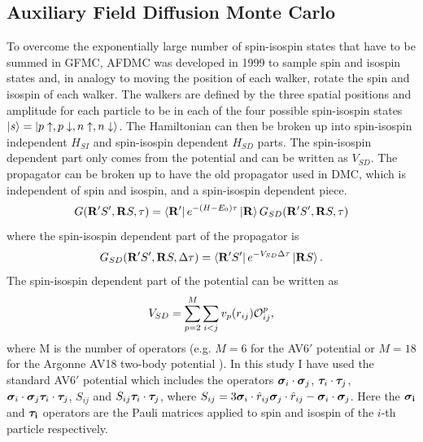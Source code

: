 \subsection{Auxiliary Field Diffusion Monte Carlo}
\label{sec:AFDMC}
To overcome the exponentially large number of spin-isospin states that have to be summed in GFMC, AFDMC was developed in 1999 \cite{schmidt1999} to sample spin and isospin states and, in analogy to moving the position of each walker, rotate the spin and isospin of each walker. The walkers are defined by the three spatial positions and amplitude for each particle to be in each of the four possible spin-isospin states $\left| s \right> = \left| p\uparrow,p\downarrow,n\uparrow,n\downarrow \right>$. The Hamiltonian can then be broken up into spin-isospin independent $H_{SI}$ and spin-isospin dependent $H_{SD}$ parts. The spin-isospin dependent part only comes from the potential and can be written as $V_{SD}$. The propagator can be broken up to have the old propagator used in DMC, which is independent of spin and isospin, and a spin-isospin dependent piece.
\begin{equation}
   G(\mathbf{R}'S',\mathbf{R} S,\tau)=\left< \mathbf{R}' \right|e^{-(H-E_0)\tau}\left| \mathbf{R} \right>G_{SD}(\mathbf{R}'S',\mathbf{R} S,\tau)
\end{equation}
where the spin-isospin dependent part of the propagator is
\begin{equation}
   G_{SD}(\mathbf{R}'S',\mathbf{R} S,\Delta\tau) = \left< \mathbf{R}'S' \right|e^{-V_{SD}\Delta\tau} \left| \mathbf{R} S \right>.
\end{equation}
The spin-isospin dependent part of the potential can be written as
\begin{equation}
   V_{SD} = \sum\limits_{p=2}^{M}\sum\limits_{i<j} v_p(r_{ij})\mathcal{O}_{ij}^p,
\end{equation}
where M is the number of operators (e.g. $M=6$ for the AV6$'$ potential or $M=18$ for the Argonne AV18 two-body potential \cite{wiringa1984}). In this study I have used the standard AV6$'$ potential which includes the operators $\bm{\sigma}_i\cdot\bm{\sigma}_j$, $\bm{\tau}_i\cdot\bm{\tau}_j$, $\bm{\sigma}_i\cdot\bm{\sigma}_j \bm{\tau}_i\cdot\bm{\tau}_j$, $S_{ij}$ and $S_{ij} \bm{\tau}_i\cdot\bm{\tau}_j$, where $S_{ij} = 3\bm{\sigma}_i\cdot\hat{r}_{ij}\bm{\sigma}_j\cdot\hat{r}_{ij}-\bm{\sigma}_i\cdot\bm{\sigma}_j$. Here the $\mathbf{\bm{\sigma}_i}$ and $\mathbf{\bm{\tau}_i}$ operators are the Pauli matrices applied to spin and isospin of the $i$-th particle respectively.

